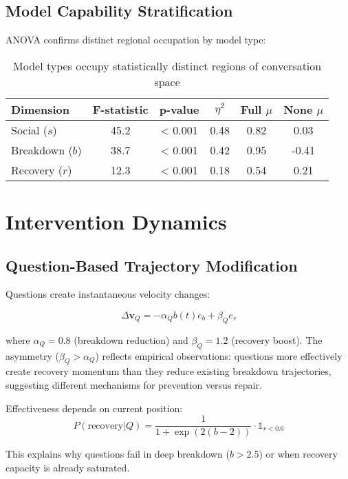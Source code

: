 \documentclass[11pt,letterpaper]{article}
\begin{document}
\subsection{Model Capability Stratification}

ANOVA confirms distinct regional occupation by model type:

\begin{table}[h]
\centering
\begin{tabular}{lccccc}
\toprule
Dimension & F-statistic & p-value & $\eta^2$ & Full $\mu$ & None $\mu$ \\
\midrule
Social ($s$) & 45.2 & < 0.001 & 0.48 & 0.82 & 0.03 \\
Breakdown ($b$) & 38.7 & < 0.001 & 0.42 & 0.95 & -0.41 \\
Recovery ($r$) & 12.3 & < 0.001 & 0.18 & 0.54 & 0.21 \\
\bottomrule
\end{tabular}
\caption{Model types occupy statistically distinct regions of conversation space}
\label{tab:anova}
\end{table}

\section{Intervention Dynamics}

\subsection{Question-Based Trajectory Modification}

Questions create instantaneous velocity changes:

\begin{equation}
\Delta \mathbf{v}_Q = -\alpha_Q b(t) e_b + \beta_Q e_r
\end{equation}

where $\alpha_Q = 0.8$ (breakdown reduction) and $\beta_Q = 1.2$ (recovery boost). The asymmetry ($\beta_Q > \alpha_Q$) reflects empirical observations: questions more effectively create recovery momentum than they reduce existing breakdown trajectories, suggesting different mechanisms for prevention versus repair.

Effectiveness depends on current position:
\begin{equation}
P(\text{recovery}|Q) = \frac{1}{1 + \exp(2(b - 2))} \cdot \mathbb{1}_{r < 0.6}
\end{equation}

This explains why questions fail in deep breakdown ($b > 2.5$) or when recovery capacity is already saturated.
\end{document}
